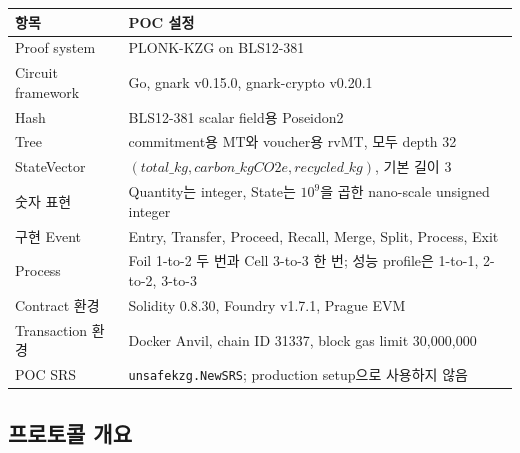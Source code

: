 \documentclass[11pt,a4paper]{extarticle}
\newcommand{\MT}{\mathrm{MT}}
\newcommand{\rvMT}{\mathrm{rvMT}}
\begin{document}
\begin{center}
  \begin{tabularx}{\textwidth}{@{}p{}X@{}}
    \toprule
    항목                & POC 설정                                                               \\
    \midrule
    Proof system      & PLONK-KZG on BLS12-381                                               \\
    Circuit framework & Go, gnark v0.15.0, gnark-crypto v0.20.1                              \\
    Hash              & BLS12-381 scalar field용 Poseidon2                                    \\
    Tree              & commitment용 $\MT$와 voucher용 $\rvMT$, 모두 depth 32                     \\
    StateVector       & $(total\_kg, carbon\_kgCO2e, recycled\_kg)$, 기본 길이 3                 \\
    숫자 표현             & Quantity는 integer, State는 $10^9$을 곱한 nano-scale unsigned integer     \\
    구현 Event          & Entry, Transfer, Proceed, Recall, Merge, Split, Process, Exit        \\
    Process           & Foil 1-to-2 두 번과 Cell 3-to-3 한 번; 성능 profile은 1-to-1, 2-to-2, 3-to-3 \\
    Contract 환경       & Solidity 0.8.30, Foundry v1.7.1, Prague EVM                          \\
    Transaction 환경    & Docker Anvil, chain ID 31337, block gas limit 30,000,000             \\
    POC SRS           & \texttt{unsafekzg.NewSRS}; production setup으로 사용하지 않음                \\
    \bottomrule
  \end{tabularx}
\end{center}

\subsection*{프로토콜 개요}
\end{document}
